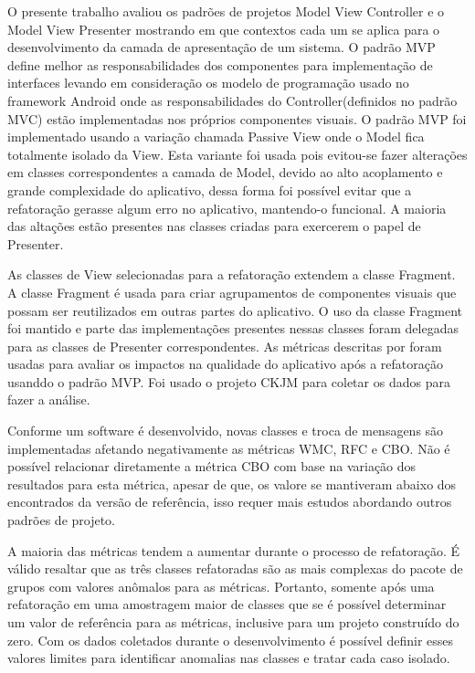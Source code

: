 \documentclass[conference]{IEEEtran}
\begin{document}
O presente trabalho avaliou os padrões de projetos Model View Controller e o
Model View Presenter mostrando em que contextos cada um se aplica para o
desenvolvimento da camada de apresentação de um sistema.
O padrão MVP define melhor as responsabilidades dos componentes para
implementação de interfaces levando em consideração os modelo de programação
usado no framework Android onde as responsabilidades do Controller(definidos no
padrão MVC) estão implementadas nos próprios componentes visuais. O padrão MVP
foi implementado usando a variação chamada Passive View onde o Model fica
totalmente isolado da View. Esta variante foi usada pois evitou-se fazer
alterações em classes correspondentes a camada de Model, devido ao alto
acoplamento e grande complexidade do aplicativo, dessa forma foi possível evitar
que a refatoração gerasse algum erro no aplicativo, mantendo-o funcional. A
maioria das altações estão presentes nas classes criadas para exercerem o papel
de Presenter.

As classes de View selecionadas para a refatoração extendem a classe Fragment.
A classe Fragment é usada para criar agrupamentos de componentes visuais que
possam ser reutilizados em outras partes do aplicativo. O uso da classe
Fragment foi mantido e parte das implementações presentes nessas classes foram
delegadas para as classes de Presenter correspondentes. As métricas descritas
por \cite{cksuite} foram usadas para avaliar os impactos na qualidade do
aplicativo após a refatoração usanddo o padrão MVP. Foi usado o projeto CKJM
para coletar os dados para fazer a análise.

Conforme um software é desenvolvido, novas classes e troca de mensagens são
implementadas afetando negativamente as métricas WMC, RFC e CBO. Não é possível
relacionar diretamente a métrica CBO com base na variação dos resultados para
esta métrica, apesar de que, os valore se mantiveram abaixo dos encontrados da
versão de referência, isso requer mais estudos abordando outros padrões de projeto.

A maioria das métricas tendem a aumentar durante o processo de refatoração. 
É válido resaltar que as três classes refatoradas são as mais complexas do
pacote de grupos com valores anômalos para as métricas. Portanto, somente após
uma refatoração em uma amostragem maior de classes que se é possível determinar
um valor de referência para as métricas, inclusive para um projeto construído
do zero. Com os dados coletados durante o desenvolvimento é possível definir
esses valores limites para identificar anomalias nas classes e tratar cada caso
isolado.
\end{document}
